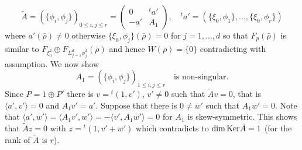 \documentclass[12pt,leqno]{article} %
\def\lr#1{\langle{#1}\rangle}
\def\bro{\bar\rho}
\def\bro{\bar\rho}
\numberwithin{equation}{section}
\begin{document}
%
\[
\tilde A=(\{\phi_i,\phi_j\})_{0\leq i, j\leq r}=\begin{pmatrix}0&{^t}a'\\
-a'&A_1\end{pmatrix},\quad {^t}a'=(\{\xi_0,\phi_1\},\ldots,\{\xi_0,\phi_r\})
\]
%
where $a'(\bro)\neq 0$ otherwise $\{\xi_0,\phi_j\}(\bro)=0$ for
$j=1,\ldots,d$ so that $F_p(\bro)$ is similar to $F_{\xi_0^2}\oplus
F_{\Sigma_{j=1}^d\phi_j^2}(\bro)$ and hence $W(\bro)=\{0\}$
contradicting with assumption. We now show
%
\begin{equation}
\label{eq:M:r}
A_1=(\{\phi_i,\phi_j\})_{1\leq i, j\leq r}\quad \text{is non-singular}.
\end{equation}
%
 Since $P=1\oplus P'$ there is $v={^t}(1,v')$, $v'\neq 0$ such that $\tilde A v=0$, that is $\lr{a', v'}=0$ and $A_1v'=a'$. Suppose that there is $0\neq w'$ such that $A_1w'=0$. Note that $\lr{a', w'}=\lr{A_1v',w'}=-\lr{v', A_1w'}=0$ for $A_1$ is skew-symmetric. This shows that $\tilde A z=0$ with $z={^t}(1,v'+w')$ which contradicts to ${\rm dim\,Ker}\tilde A=1$ (for the rank of $\tilde A$ is $r$).
\end{document}
